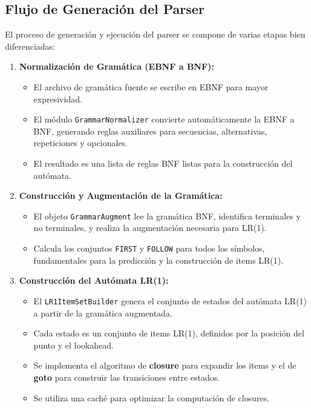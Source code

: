 \documentclass[11pt, a4paper, twoside]{article} %
\begin{document}
\subsection{Flujo de Generación del Parser}

El proceso de generación y ejecución del parser se compone de varias etapas bien diferenciadas:

\begin{enumerate}
    \item \textbf{Normalización de Gramática (EBNF a BNF):}
    \begin{itemize}
        \item El archivo de gramática fuente se escribe en EBNF para mayor expresividad.
        \item El módulo \texttt{GrammarNormalizer} convierte automáticamente la EBNF a BNF, generando reglas auxiliares para secuencias, alternativas, repeticiones y opcionales.
        \item El resultado es una lista de reglas BNF listas para la construcción del autómata.
    \end{itemize}

    \item \textbf{Construcción y Augmentación de la Gramática:}
    \begin{itemize}
        \item El objeto \texttt{GrammarAugment} lee la gramática BNF, identifica terminales y no terminales, y realiza la augmentación necesaria para LR(1).
        \item Calcula los conjuntos \texttt{FIRST} y \texttt{FOLLOW} para todos los símbolos, fundamentales para la predicción y la construcción de items LR(1).
    \end{itemize}

    \item \textbf{Construcción del Autómata LR(1):}
    \begin{itemize}
        \item El \texttt{LR1ItemSetBuilder} genera el conjunto de estados del autómata LR(1) a partir de la gramática augmentada.
        \item Cada estado es un conjunto de items LR(1), definidos por la posición del punto y el lookahead.
        \item Se implementa el algoritmo de \textbf{closure} para expandir los items y el de \textbf{goto} para construir las transiciones entre estados.
        \item Se utiliza una caché para optimizar la computación de closures.
    \end{itemize}


\end{enumerate}
\end{document}
